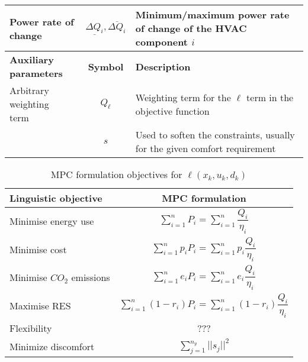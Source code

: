 \documentclass[10pt]{extarticle}
\begin{document}
\begin{table}[h]
\begin{tabular}{l|c|l}
		Power rate of change & $\underline{\Delta Q_i},\overline{\Delta Q_i}$ & Minimum/maximum power rate of change of the HVAC component $i$ \\
		\midrule
		\textbf{Auxiliary parameters}  & \textbf{Symbol} &  \textbf{Description} \\
		\midrule
		\makecell[l]{Arbitrary weighting \\ term} & $Q_{\ell}$ &  Weighting term for the $\ell$ term in the objective function \\
		\makecell[l]{Slack variable} & $s$ &  Used to soften the constraints, usually for the given comfort requirement \\
		\bottomrule 
	\end{tabular}
\end{table}

\renewcommand{\arraystretch}{2.5}
\begin{table}[h]
	\centering
	\caption{MPC formulation objectives for $\ell(x_k, u_k, d_k)$}
	\label{tab:mpc_form:objectives}
	\begin{tabular}{l|c}
		\toprule
		\textbf{Linguistic objective}  & \textbf{MPC formulation} \\
		\midrule
		Minimise energy use &   $ \sum_{i=1}^{n} P_i = \sum_{i=1}^{n} \dfrac{Q_{i}}{\eta_i}$ \\
		Minimise cost & $ \sum_{i=1}^{n} p_i P_i = \sum_{i=1}^{n} p_i \dfrac{Q_{i}}{\eta_i}$  \\
		Minimise $CO_2$ emissions & $ \sum_{i=1}^{n} e_i P_i = \sum_{i=1}^{n}  e_i \dfrac{Q_{i}}{\eta_i}$  \\
		Maximise RES &  $ \sum_{i=1}^{n} (1-r_i) P_i  = \sum_{i=1}^{n} (1-r_i) \dfrac{Q_{i}}{\eta_i}$  \\
		Flexibility & ???  \\
		Minimize discomfort &  $ \sum_{j=1}^{n_y} ||s_j||^2$ \\
		\bottomrule 
	\end{tabular}
\end{table}
\end{document}
